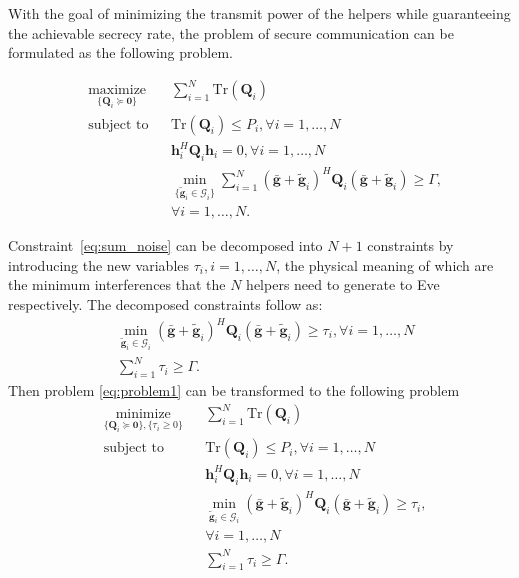 \documentclass[journal]{IEEEtran}
\begin{document}
With the goal of minimizing the transmit power of the helpers while guaranteeing the achievable secrecy rate, the problem of secure communication can be formulated as the following problem.

\begin{equation}
\begin{aligned} \label{eq:problem1}
& \underset{\{\mathbf{Q}_i \succeq \mathbf{0}\}}{\text{maximize}}
& & \sum_{i = 1}^{N}\mathrm{Tr}(\mathbf{Q}_i) \\
& \text{subject to}
& & \mathrm{Tr}(\mathbf{Q}_i) \leq P_i, \forall i = 1, \ldots, N\\
&&& \mathbf{h}_i^H \mathbf{Q}_i \mathbf{h}_i= 0, \forall i = 1,\ldots,N\\
&&& \min_{\{\tilde{\mathbf{g}}_i \in \mathcal{G}_i\}}\sum_{i=1}^{N}(\bar{\mathbf{g}}+\tilde{\mathbf{g}}_i)^H\mathbf{Q}_i(\bar{\mathbf{g}}+\tilde{\mathbf{g}}_i) \geq  \Gamma,\\
&&& \forall i = 1, \ldots, N.
\end{aligned}
\end{equation}


Constraint~\eqref{eq:sum_noise} can be decomposed into $N+1$ constraints by introducing the new variables $\tau_i, i =1,\ldots,N$, the physical meaning of which are the minimum interferences that the $N$ helpers need to generate to Eve respectively. The decomposed constraints follow as:
\begin{eqnarray}
&\underset{\tilde{\mathbf{g}}_i \in \mathcal{G}_i }\min(\bar{\mathbf{g}}+\tilde{\mathbf{g}}_i)^H\mathbf{Q}_i(\bar{\mathbf{g}}+\tilde{\mathbf{g}}_i) \geq  \tau_i, \forall i = 1,\ldots,N\label{eq:artificial noise constraint decomposed}\nonumber\\
&\sum_{i =1}^{N}\tau_i \geq \Gamma.
\end{eqnarray}
Then problem \eqref{eq:problem1} can be transformed to the following problem
\begin{equation}
\begin{aligned} \label{eq:problem2}
& \underset{\{\mathbf{Q}_i \succeq \mathbf{0}\},\{\tau_i \geq 0\}}{\text{minimize}}
& & \sum_{i = 1}^{N}\mathrm{Tr}(\mathbf{Q}_i) \\
& \text{subject to}
& & \mathrm{Tr}(\mathbf{Q}_i) \leq P_i, \forall i = 1, \ldots, N\\
&&& \mathbf{h}_i^H \mathbf{Q}_i \mathbf{h}_i= 0, \forall i = 1,\ldots,N\\
&&& \min_{\tilde{\mathbf{g}}_i \in \mathcal{G}_i}(\bar{\mathbf{g}}+\tilde{\mathbf{g}}_i)^H\mathbf{Q}_i(\bar{\mathbf{g}}+\tilde{\mathbf{g}}_i) \geq  \tau_i,\\
&&&\forall i = 1,\ldots,N\\
&&&\sum_{i =1}^{N}\tau_i \geq \Gamma.
\end{aligned}
\end{equation}
\end{document}
